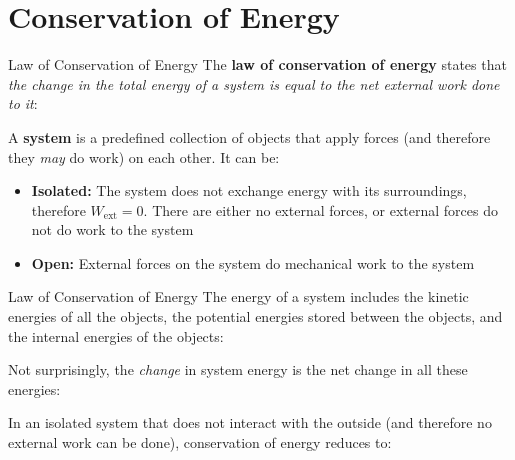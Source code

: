 \documentclass[12pt,compress,aspectratio=169]{beamer}
\begin{document}
\section{Conservation of Energy}

\begin{frame}{Law of Conservation of Energy}
  The \textbf{law of conservation of energy} states that \emph{the change in
  the total energy of a system is equal to the net external work done to it}:


  A \textbf{system} is a predefined collection of objects that apply forces (and
  therefore they \emph{may} do work) on each other. It can be:
  \begin{itemize}
  \item\textbf{Isolated:} The system does not exchange energy with its
    surroundings, therefore $W_\text{ext}=0$. There are either no external
    forces, or external forces do not do work to the system
  \item\textbf{Open:} External forces on the system do mechanical work to the
    system
  \end{itemize}
\end{frame}



\begin{frame}{Law of Conservation of Energy}
  The energy of a system includes the kinetic energies of all the objects, the
  potential energies stored between the objects, and the internal energies of
  the objects:

  
  Not surprisingly, the \emph{change} in system energy is the net change
  in all these energies:
  

  \vspace{-.1in}In an isolated system that does not interact with the outside
  (and therefore no external work can be done), conservation of energy reduces
  to:

\end{frame}
\end{document}
